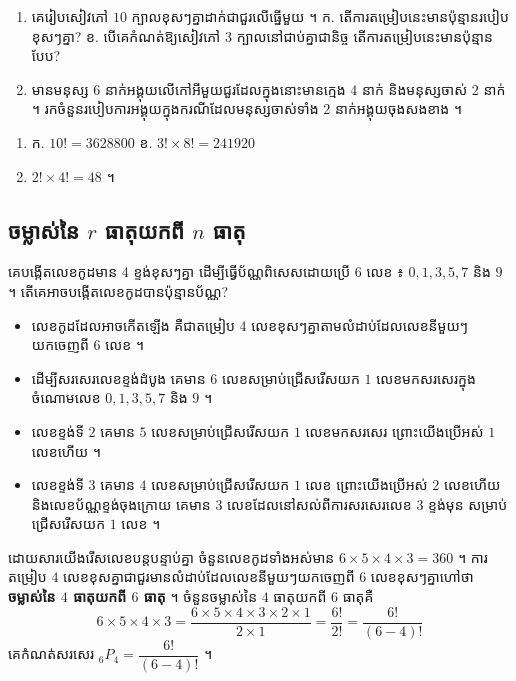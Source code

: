 \begin{pro}
\begin{enumerate}[1]
  \item គេរៀបសៀវភៅ $10$ ក្បាលខុសៗគ្នាដាក់ជាជួរលើធ្នើមួយ ។ ក. តើការតម្រៀបនេះមានប៉ុន្មានរបៀបខុសៗគ្នា? \quad ខ. បើគេកំណត់ឱ្យសៀវភៅ $3$ ក្បាលនៅជាប់គ្នាជានិច្ច តើការតម្រៀបនេះមានប៉ុន្មានបែប?
  \item មានមនុស្ស $6$ នាក់អង្គុយលើកៅអីមួយជួរដែលក្នុងនោះមានក្មេង $4$ នាក់ និងមនុស្សចាស់ $2$ នាក់ ។ រកចំនួនរបៀបការអង្គុយក្នុងករណីដែលមនុស្សចាស់ទាំង $2$ នាក់អង្គុយចុងសងខាង ។
\end{enumerate}
\ans
\begin{enumerate}[1]
  \item ក. $10! = 3628800$ \quad ខ. $3!\times 8! = 241920$
  \item $2!\times 4! = 48$ ។
\end{enumerate}
\end{pro}

\subsection{ចម្លាស់នៃ \texorpdfstring{$r$}{r} ធាតុយកពី \texorpdfstring{$n$}{n} ធាតុ}

\begin{example}[ឧទាហរណ៍]
គេបង្កើតលេខកូដមាន $4$ ខ្ទង់ខុសៗគ្នា ដើម្បីធ្វើប័ណ្ណពិសេសដោយប្រើ $6$ លេខ ៖ $0, 1, 3, 5, 7$ និង $9$ ។ តើគេអាចបង្កើតលេខកូដបានប៉ុន្មានប័ណ្ណ?
\end{example}
\begin{itemize}
  \item លេខកូដដែលអាចកើតឡើង គឺជាតម្រៀប $4$ លេខខុសៗគ្នាតាមលំដាប់ដែលលេខនីមួយៗយកចេញពី $6$ លេខ ។
  \item ដើម្បីសរសេរលេខខ្ទង់ដំបូង គេមាន $6$ លេខសម្រាប់ជ្រើសរើសយក $1$ លេខមកសរសេរក្នុងចំណោមលេខ $0, 1, 3, 5, 7$ និង $9$ ។
  \item លេខខ្ទង់ទី $2$ គេមាន $5$ លេខសម្រាប់ជ្រើសរើសយក $1$ លេខមកសរសេរ ព្រោះយើងប្រើអស់ $1$ លេខហើយ ។
  \item លេខខ្ទង់ទី $3$ គេមាន $4$ លេខសម្រាប់ជ្រើសរើសយក $1$ លេខ ព្រោះយើងប្រើអស់ $2$ លេខហើយ និងលេខប័ណ្ណខ្ទង់ចុងក្រោយ គេមាន $3$ លេខដែលនៅសល់ពីការសរសេរលេខ $3$ ខ្ទង់មុន សម្រាប់ជ្រើសរើសយក $1$ លេខ ។
\end{itemize}
ដោយសារយើងរើសលេខបន្តបន្ទាប់គ្នា ចំនួនលេខកូដទាំងអស់មាន $6\times 5\times 4\times 3 = 360$ ។ ការតម្រៀប $4$ លេខខុសគ្នាជាជួរមានលំដាប់ដែលលេខនីមួយៗយកចេញពី $6$ លេខខុសៗគ្នាហៅថា \textbf{ចម្លាស់នៃ $4$ ធាតុយកពី $6$ ធាតុ} ។ ចំនួនចម្លាស់នៃ $4$ ធាតុយកពី $6$ ធាតុគឺ
\[ 6\times 5\times 4\times 3 = \frac{6\times 5\times 4\times 3\times 2\times 1}{2\times 1} = \frac{6!}{2!} = \frac{6!}{(6 - 4)!} \]
គេកំណត់សរសេរ ${}_6P_4 = \dfrac{6!}{(6 - 4)!}$ ។

